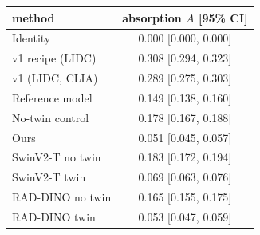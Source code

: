 \begin{tabular}{lc}
\toprule
method & absorption $A$ [95\% CI] \\
\midrule
Identity & 0.000 [0.000, 0.000] \\
v1 recipe (LIDC) & 0.308 [0.294, 0.323] \\
v1 (LIDC, CLIA) & 0.289 [0.275, 0.303] \\
Reference model & 0.149 [0.138, 0.160] \\
No-twin control & 0.178 [0.167, 0.188] \\
Ours & 0.051 [0.045, 0.057] \\
SwinV2-T no twin & 0.183 [0.172, 0.194] \\
SwinV2-T twin & 0.069 [0.063, 0.076] \\
RAD-DINO no twin & 0.165 [0.155, 0.175] \\
RAD-DINO twin & 0.053 [0.047, 0.059] \\
\bottomrule
\end{tabular}
